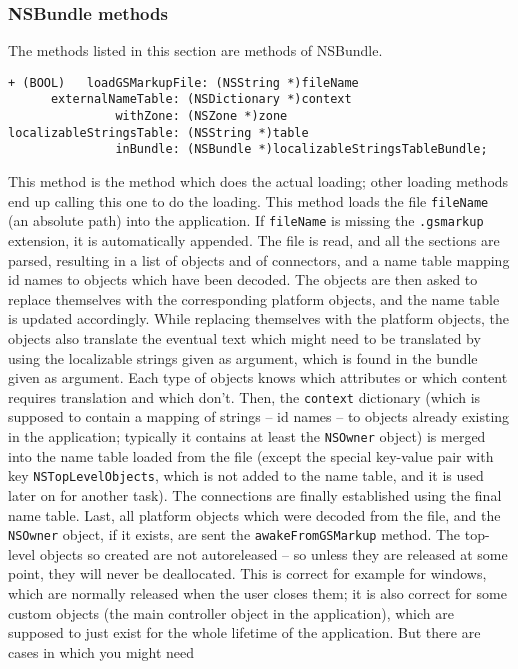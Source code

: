\subsubsection{NSBundle methods}
The methods listed in this section are methods of NSBundle.
\begin{verbatim}
+ (BOOL)   loadGSMarkupFile: (NSString *)fileName
      externalNameTable: (NSDictionary *)context
               withZone: (NSZone *)zone
localizableStringsTable: (NSString *)table
               inBundle: (NSBundle *)localizableStringsTableBundle;
\end{verbatim}
This method is the method which does the actual loading; other loading
methods end up calling this one to do the loading.  This method loads
the file \texttt{fileName} (an absolute path) into the application.
If \texttt{fileName} is missing the \texttt{.gsmarkup} extension, it is
automatically appended.  The file is read, and all the sections are
parsed, resulting in a list of objects and of connectors, and a name
table mapping id names to objects which have been decoded.  The
objects are then asked to replace themselves with the corresponding
platform objects, and the name table is updated accordingly.  While
replacing themselves with the platform objects, the objects also
translate the eventual text which might need to be translated by using
the localizable strings given as argument, which is found in the
bundle given as argument.  Each type of objects knows which attributes
or which content requires translation and which don't.  Then, the
\texttt{context} dictionary (which is supposed to contain a mapping of
strings -- id names -- to objects already existing in the application;
typically it contains at least the \texttt{NSOwner} object) is merged
into the name table loaded from the file (except the special key-value
pair with key \texttt{NSTopLevelObjects}, which is not added to the
name table, and it is used later on for another task).  The
connections are finally established using the final name table.  Last,
all platform objects which were decoded from the file, and the
\texttt{NSOwner} object, if it exists, are sent the 
\texttt{awakeFromGSMarkup} method.  The top-level objects so created are
not autoreleased -- so unless they are released at some point, they
will never be deallocated.  This is correct for example for windows,
which are normally released when the user closes them; it is also
correct for some custom objects (the main controller object in the
application), which are supposed to just exist for the whole lifetime
of the application.  But there are cases in which you might need
